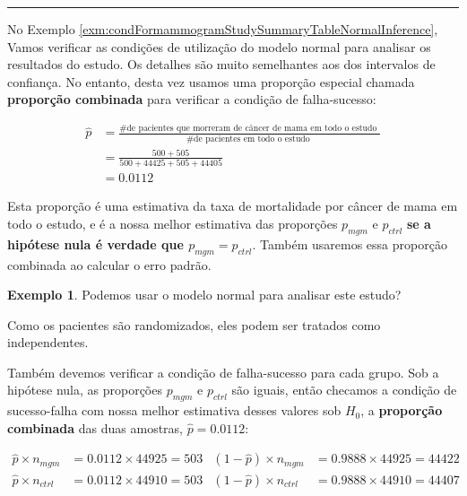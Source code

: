 \documentclass[
]{book}
\theoremstyle{definition}
\theoremstyle{definition}
\newtheorem{example}{Exemplo}[chapter]
\theoremstyle{definition}
\theoremstyle{definition}
\theoremstyle{remark}
\begin{document}
\begin{center}\rule{0.5\linewidth}{0.5pt}\end{center}

No Exemplo \ref{exm:condFormammogramStudySummaryTableNormalInference}, Vamos verificar as condições de utilização do modelo normal para analisar os resultados do estudo. Os detalhes são muito semelhantes aos dos intervalos de confiança. No entanto, desta vez usamos uma proporção especial chamada \textbf{proporção combinada} para verificar a condição de falha-sucesso:

\begin{align*}
\hat{p} &= \frac{\text{\# de pacientes que morreram de câncer de mama em todo o estudo }}{\text{\# de pacientes em todo o estudo }} \\
    &= \frac{500 + 505}{500 + \text{44425} + 505 + \text{44405}} \\
    &= 0.0112
\end{align*}

Esta proporção é uma estimativa da taxa de mortalidade por câncer de mama em todo o estudo, e é a nossa melhor estimativa das proporções \(p_{mgm}\) e \(p_{ctrl}\) \textbf{se a hipótese nula é verdade que \(p_{mgm} = p_{ctrl}\)}. Também usaremos essa proporção combinada ao calcular o erro padrão.

\begin{example}
\protect\hypertarget{exm:condFormammogramStudySummaryTableNormalInference}{}{\label{exm:condFormammogramStudySummaryTableNormalInference} }Podemos usar o modelo normal para analisar este estudo?
\end{example}

Como os pacientes são randomizados, eles podem ser tratados como independentes.

Também devemos verificar a condição de falha-sucesso para cada grupo. Sob a hipótese nula, as proporções \(p_{mgm}\) e \(p_{ctrl}\) são iguais, então checamos a condição de sucesso-falha com nossa melhor estimativa desses valores sob \(H_0\), a \textbf{proporção combinada} das duas amostras, \(\hat{p} = 0.0112\):

\begin{align*}
\hat{p} \times n_{mgm} &= 0.0112 \times \text{44925} = 503
    & (1 - \hat{p}) \times n_{mgm} &= 0.9888 \times \text{44925} = \text{44422} \\
\hat{p} \times n_{ctrl} &= 0.0112 \times \text{44910} = 503
    & (1 - \hat{p}) \times n_{ctrl} &= 0.9888 \times \text{44910} = \text{44407}
\end{align*}
\end{document}
